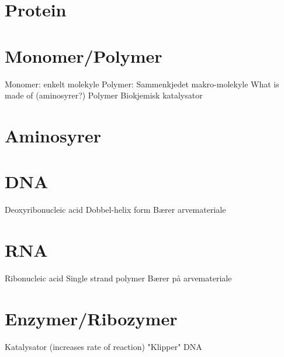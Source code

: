 \section{Protein}
\section{Monomer/Polymer}
Monomer: enkelt molekyle 
Polymer: Sammenkjedet makro-molekyle
What is made of (aminosyrer?)
Polymer
Biokjemisk katalysator
\section{Aminosyrer}
\section{DNA}
Deoxyribonucleic acid
Dobbel-helix form
Bærer arvemateriale
\section{RNA}
Ribonucleic acid
Single strand polymer
Bærer på arvemateriale
\section {Enzymer/Ribozymer}
Katalysator (increases rate of reaction)
"Klipper" DNA
